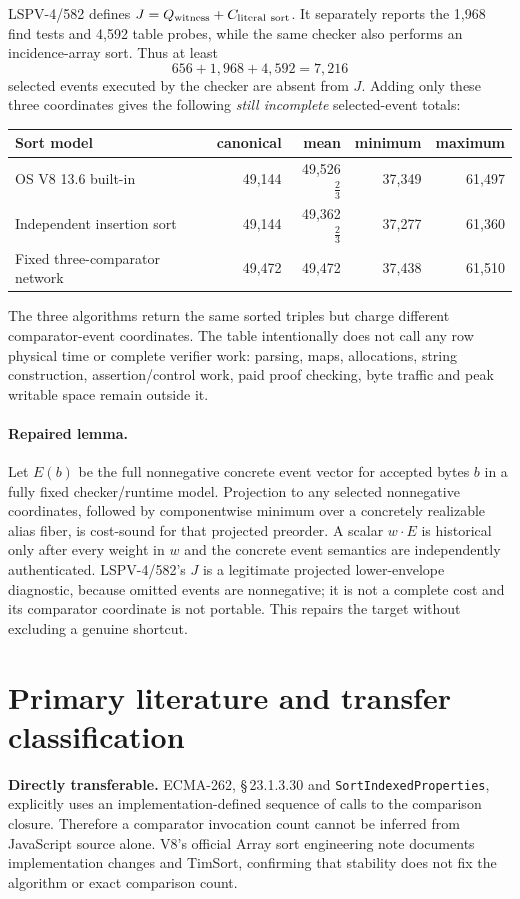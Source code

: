 \documentclass[11pt]{article}
\begin{document}
LSPV-4/582 defines \(J=Q_{\rm witness}+C_{\rm literal\ sort}\).  It separately reports the 1,968 find tests and 4,592 table probes, while the same checker also performs an incidence-array sort.  Thus at least
\[
 656+1{,}968+4{,}592=7{,}216
\]
selected events executed by the checker are absent from $J$.  Adding only these three coordinates gives the following \emph{still incomplete} selected-event totals:
\begin{center}
\begin{tabular}{@{}lrrrr@{}}
\toprule
Sort model & canonical & mean & minimum & maximum\\
\midrule
OS V8 13.6 built-in & 49,144 & 49,526$\frac23$ & 37,349 & 61,497\\
Independent insertion sort & 49,144 & 49,362$\frac23$ & 37,277 & 61,360\\
Fixed three-comparator network & 49,472 & 49,472 & 37,438 & 61,510\\
\bottomrule
\end{tabular}
\end{center}
The three algorithms return the same sorted triples but charge different comparator-event coordinates.  The table intentionally does not call any row physical time or complete verifier work: parsing, maps, allocations, string construction, assertion/control work, paid proof checking, byte traffic and peak writable space remain outside it.

\paragraph{Repaired lemma.}
Let $E(b)$ be the full nonnegative concrete event vector for accepted bytes $b$ in a fully fixed checker/runtime model.  Projection to any selected nonnegative coordinates, followed by componentwise minimum over a concretely realizable alias fiber, is cost-sound for that projected preorder.  A scalar $w\cdot E$ is historical only after every weight in $w$ and the concrete event semantics are independently authenticated.  LSPV-4/582's $J$ is a legitimate projected lower-envelope diagnostic, because omitted events are nonnegative; it is not a complete cost and its comparator coordinate is not portable.  This repairs the target without excluding a genuine shortcut.

\section*{Primary literature and transfer classification}
\textbf{Directly transferable.} ECMA-262, \S\,23.1.3.30 and \texttt{SortIndexedProperties}, explicitly uses an implementation-defined sequence of calls to the comparison closure.  Therefore a comparator invocation count cannot be inferred from JavaScript source alone.  V8's official Array sort engineering note documents implementation changes and TimSort, confirming that stability does not fix the algorithm or exact comparison count.
\end{document}
